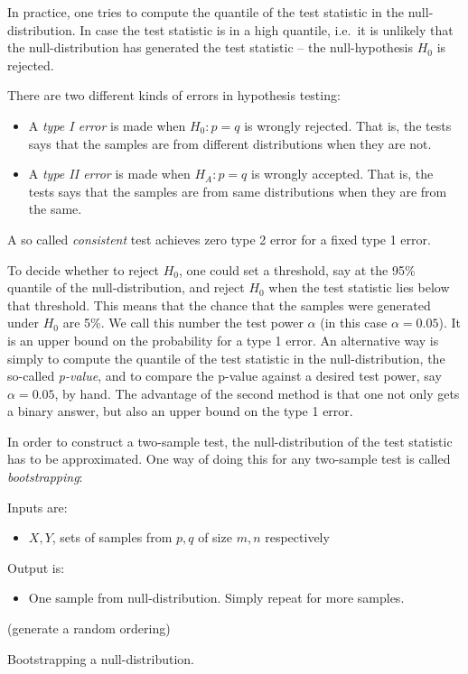 In practice, one tries to compute the quantile of the test statistic in the null-distribution. In case the test statistic is in a high quantile, i.e.\ it is unlikely that the null-distribution has generated the test statistic -- the null-hypothesis $H_0$ is rejected.

There are two different kinds of errors in hypothesis testing:
\begin{itemize}
\item A \emph{type I error} is made when $H_0: p=q$ is wrongly rejected. That is, the tests says that the samples are from different distributions when they are not.
\item A \emph{type II error} is made when $H_A: p=q$ is wrongly accepted. That is, the tests says that the samples are from same distributions when they are from the same.
\end{itemize}
A so called \emph{consistent} test achieves zero type 2 error for a fixed type 1 error.

To decide whether to reject $H_0$, one could set a threshold, say at the 95\% quantile of the null-distribution, and reject $H_0$ when the test statistic lies below that threshold. This means that the chance that the samples were generated under $H_0$ are 5\%. We call this number the test power $\alpha$ (in this case $\alpha=0.05$). It is an upper bound on the probability for a type 1 error. An alternative way is simply to compute the quantile of the test statistic in the null-distribution, the so-called \emph{p-value}, and to compare the p-value against a desired test power, say $\alpha=0.05$, by hand. The advantage of the second method is that one not only gets a binary answer, but also an upper bound on the type 1 error.

In order to construct a two-sample test, the null-distribution of the test statistic has to be approximated. One way of doing this for any two-sample test is called \emph{bootstrapping}:
\begin{algorithm}
Inputs are:
\begin{itemize}
 \item $X,Y$, sets of samples from $p,q$ of size $m,n$ respectively
\end{itemize}
Output is:
\begin{itemize}
 \item One sample from null-distribution. Simply repeat for more samples.
\end{itemize}

 \begin{algorithmic}[1]
 \qquad (generate a random ordering)
\end{algorithmic}
\caption{Bootstrapping a null-distribution.}
\label{alg:bootstrapping}
\end{algorithm}

